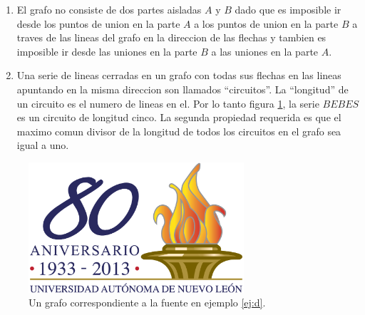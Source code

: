 \begin{enumerate}
  \item El grafo no consiste de dos partes aisladas $A$ y $B$ dado que
    es imposible ir desde los puntos de union en la parte $A$ a los
    puntos de union en la parte $B$ a traves de las lineas del grafo
    en la direccion de las flechas y tambien es imposible ir desde las
    uniones en la parte $B$ a las uniones en la parte $A$.
 \item Una serie de lineas cerradas en un grafo con todas sus flechas
   en las lineas apuntando en la misma direccion son llamados
   ``circuitos''.  La ``longitud'' de un circuito es el numero de
   lineas en el.  Por lo tanto figura \ref{fig:5}, la serie $BEBES$ es
   un circuito de longitud cinco.  La segunda propiedad requerida es
   que el maximo comun divisor de la longitud de todos los circuitos
   en el grafo sea igual a uno.
\end{enumerate}

\begin{figure}[!ht]
\centerline{\includegraphics[width=80mm]{ejemplo.png}}
\caption{Un grafo correspondiente a la fuente en ejemplo \ref{ej:d}.}
\label{fig:5}
\end{figure}

